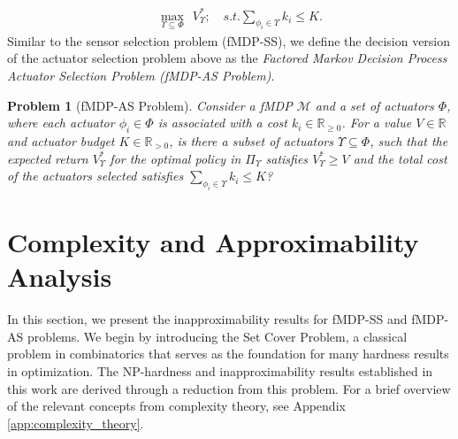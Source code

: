 \documentclass[twocolumn]{autart}    %
\newtheorem{problem}{Problem}
\begin{document}
\begin{align}
& \hspace{10pt}  \max_{\Upsilon \subseteq \Phi} \hspace{5pt}  V_\Upsilon^*; 
 \quad \textit{s.t.} \sum_{\phi_i \in \Upsilon} k_i  \leq K.
\end{align}
Similar to the sensor selection problem (fMDP-SS), we define the decision version of the actuator selection problem above as the \textit{Factored Markov Decision Process Actuator Selection Problem (fMDP-AS Problem)}. \\

\begin{problem}[fMDP-AS Problem]
\label{prob:momdpas}
Consider a fMDP $\mathcal{M}$ and a set of actuators $\Phi$, where each actuator $\phi_i \in \Phi$ is associated with a cost $k_i \in \mathbb{R}_{\geq 0}$. For a value $V \in \mathbb{R}$ and actuator budget $K \in \mathbb{R}_{> 0}$, is there a subset of actuators $\Upsilon \subseteq \Phi$, such that the expected return $V_\Upsilon^*$ for the optimal policy in $ \Pi_\Upsilon$ satisfies  $V_\Upsilon^* \geq V$ and the total cost of the actuators selected satisfies $\sum_{\phi_i \in \Upsilon} k_i \leq K$?
\end{problem}

\section{Complexity and Approximability Analysis}

In this section, we present the inapproximability results for fMDP-SS and fMDP-AS problems. We begin by introducing the Set Cover Problem, a classical problem in combinatorics that serves as the foundation for many hardness results in optimization. The NP-hardness and inapproximability results established in this work are derived through a reduction from this problem. {For a brief overview of the relevant concepts from complexity theory, see Appendix \ref{app:complexity_theory}.} 

% 
\end{document}
